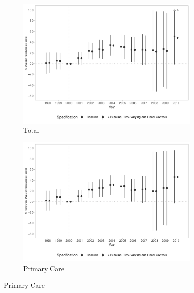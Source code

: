 \begin{figure}[h!]
    \begin{center}
    \caption{Effects on Ambulatorial Production}\label{fig:14}
    \begin{subfigure}{0.48\textwidth}
        \centering
        \caption{\scriptsize Total}\label{fig:14a}
        \includegraphics[width=\textwidth]{plots/sia_pcapita_dist_ec29_baseline_dist_ec29_baseline_14.pdf}
    \end{subfigure}
    \begin{subfigure}{0.48\textwidth}
        \centering
        \caption{\scriptsize Primary Care}\label{fig:14b}
        \includegraphics[width=\textwidth]{plots/sia_ab_pcapita_dist_ec29_baseline_dist_ec29_baseline_14.pdf}
    \end{subfigure}

\end{center}
\end{figure}
